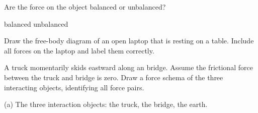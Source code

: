 \documentclass[answers]{exam}
\begin{document}
\begin{questions}
\question \label{3M4Xb}
Are the force on the object balanced or unbalanced?

\begin{randomizeoneparchoices}[norandomize]
    \choice balanced
    \correctchoice unbalanced
\end{randomizeoneparchoices}

\fi

\clearpage

\ifprintanswers
    \printkeytable
\fi

\clearpage

\question[3]
Draw the free-body diagram of an open laptop that is resting on a table. Include all forces on the laptop and label them correctly. 


\begin{solutionorbox}[6cm]
\begin{center}
\end{center}
\end{solutionorbox}


\question[3]
A truck momentarily skids eastward along an bridge. Assume the frictional force between the truck and bridge is zero. Draw a force schema of the three interacting objects, identifying all force pairs. 

\begin{solutionorbox}[10cm]
(a) The three interaction objects: the truck, the bridge, the earth.


\end{solutionorbox}
\end{questions}
\end{document}
